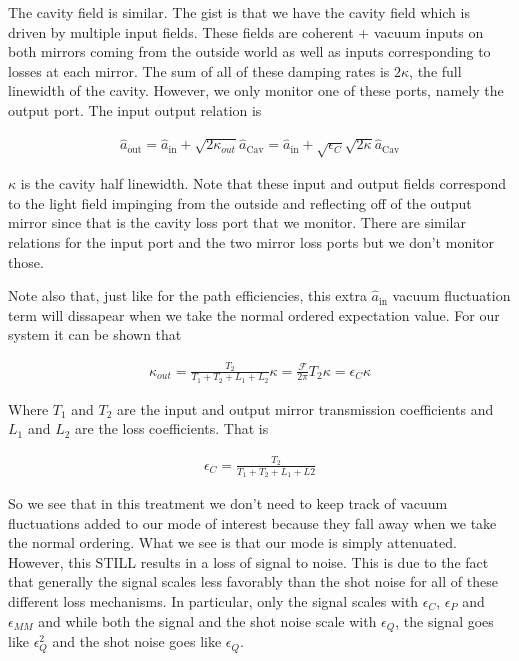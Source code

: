 \documentclass[12pt]{article}
\begin{document}
The cavity field is similar. The gist is that we have the cavity field which is driven by multiple input fields. These fields are coherent + vacuum inputs on both mirrors coming from the outside world as well as inputs corresponding to losses at each mirror. The sum of all of these damping rates is $2 \kappa$, the full linewidth of the cavity. However, we only monitor one of these ports, namely the output port. The input output relation is

\begin{align}
\hat{a}_{\text{out}} =  \hat{a}_{\text{in}} + \sqrt{2 \kappa_{out}} \hat{a}_{\text{Cav}} = \hat{a}_{\text{in}} + \sqrt{\epsilon_C} \sqrt{2\kappa} \hat{a}_{\text{Cav}}
\end{align}

$\kappa$ is the cavity half linewidth.
Note that these input and output fields correspond to the light field impinging from the outside and reflecting off of the output mirror since that is the cavity loss port that we monitor. There are similar relations for the input port and the two mirror loss ports but we don't monitor those.

Note also that, just like for the path efficiencies, this extra $\hat{a}_{\text{in}}$ vacuum fluctuation term will dissapear when we take the normal ordered expectation value. For our system it can be shown that

\begin{align}
\kappa_{out} = \frac{T_2}{T_1+T_2+L_1+L_2} \kappa = \frac{\mathcal{F}}{2\pi} T_2 \kappa = \epsilon_C \kappa
\end{align}

Where $T_1$ and $T_2$ are the input and output mirror transmission coefficients and $L_1$ and $L_2$ are the loss coefficients. That is 

\begin{align}
\epsilon_C = \frac{T_2}{T_1+T_2+L_1+L2}
\end{align}

So we see that in this treatment we don't need to keep track of vacuum fluctuations added to our mode of interest because they fall away when we take the normal ordering. What we see is that our mode is simply attenuated. However, this STILL results in a loss of signal to noise. This is due to the fact that generally the signal scales less favorably than the shot noise for all of these different loss mechanisms. In particular, only the signal scales with $\epsilon_C$, $\epsilon_{P}$ and $\epsilon_{MM}$ and while both the signal and the shot noise scale with $\epsilon_Q$, the signal goes like $\epsilon_Q^2$ and the shot noise goes like $\epsilon_Q$.
\end{document}
